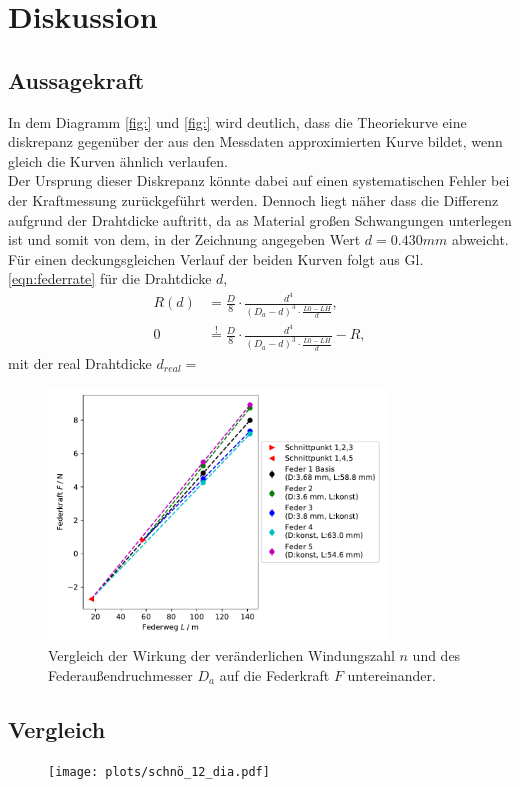 \newpage
\section{Diskussion}
\subsection{Aussagekraft}
In dem Diagramm \ref{fig:} und \ref{fig:} wird deutlich, dass die
Theoriekurve eine diskrepanz gegenüber der aus den Messdaten approximierten 
Kurve bildet, wenn gleich die Kurven ähnlich verlaufen.\\
Der Ursprung dieser Diskrepanz könnte dabei auf einen systematischen Fehler
bei der Kraftmessung zurückgeführt werden. Dennoch liegt näher dass die Differenz
aufgrund der Drahtdicke auftritt, da as Material großen Schwangungen unterlegen ist 
und somit von dem, in der Zeichnung angegeben Wert $d=0.430\si{mm}$ abweicht.\\
Für einen deckungsgleichen Verlauf der beiden Kurven folgt aus Gl. \ref{eqn:federrate} für die Drahtdicke $d$,
\begin{align*}
    R(d)&=\frac{D}{8} \cdot \frac{d^4}{(D_a-d)^3\cdot \frac{L0-LH}{d}},\\
    0&\overset{\text{!}}{=}\frac{D}{8} \cdot \frac{d^4}{(D_a-d)^3\cdot \frac{L0-LH}{d}}-R,
\end{align*}
mit der real Drahtdicke $d_{real}=$  

\begin{figure}
    \center
    \includegraphics[width=0.8\textwidth]{plots/diss_kraft_dia.pdf}
    \caption{
        Vergleich der Wirkung der veränderlichen Windungszahl $n$ und
        des Federaußendruchmesser $D_a$ auf die Federkraft $F$ untereinander.
    }
\end{figure}

\subsection{Vergleich}

\begin{figure}[H]
    \center
    \texttt{[image: plots/schnö\_12\_dia.pdf]}
    \caption{}
\end{figure}

\label{sec:Diskussion}
